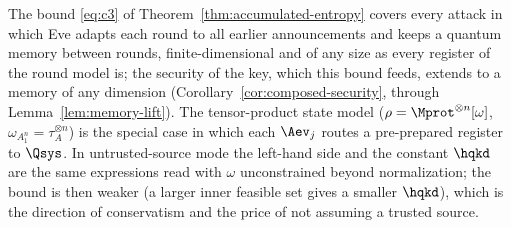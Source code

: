 
\begin{remark}\label{rem:accumulation-scope}
The bound \eqref{eq:c3} of Theorem~\ref{thm:accumulated-entropy} covers
every attack in which Eve adapts each round to all earlier announcements and
keeps a quantum memory between rounds, finite-dimensional and of any size as
every register of the round model is; the security of the key, which this
bound feeds, extends to a memory of any dimension
(Corollary~\ref{cor:composed-security}, through
Lemma~\ref{lem:memory-lift}). The tensor-product state
model ($\rho=\Mprot^{\otimes n}[\omega]$,
$\omega_{A_1^n}=\tau_A^{\otimes n}$) is the special case in which each
$\Aev_j$ routes a pre-prepared register to $\Qsys$. In
untrusted-source mode the left-hand side and the constant
$\hqkd$ are the same expressions read with $\omega$ unconstrained
beyond normalization; the bound is then weaker (a larger inner feasible
set gives a smaller $\hqkd$), which is the direction of conservatism
and the price of not assuming a trusted source.
\end{remark}

